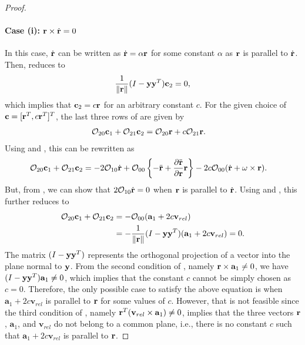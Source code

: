 \begin{proof}
\paragraph{Case (i): $\mathbf{r}\times\dot {\mathbf{r}}=0$} In this case, $\dot {\mathbf{r}}$ can be written as $\dot {\mathbf{r}} = \alpha\mathbf{r}$ for some constant $\alpha$ as $\mathbf{r}$ is parallel to $\dot{\mathbf{r}}$. Then,  reduces to 
\begin{align*}
\frac{1}{\|\mathbf{r}\|}(I-\mathbf{y}\mathbf{y}^T)\mathbf{c}_2=0,
\end{align*}
which implies that $\mathbf{c}_2= c\mathbf{r}$ for an arbitrary constant $c$. For the given choice of $\mathbf{c}=[\mathbf{r}^T,c\mathbf{r}^T]^T$, the last three rows of  are given by
\begin{align*}
\mathcal{O}_{20} \mathbf{c}_1 +\mathcal{O}_{21} \mathbf{c}_2 
& = \mathcal{O}_{20} \mathbf{r} + c\mathcal{O}_{21} \mathbf{r}.
\end{align*}
Using  and , this can be rewritten as
\begin{align*}
\mathcal{O}_{20} \mathbf{c}_1 +\mathcal{O}_{21} \mathbf{c}_2 
& =
-2\mathcal{O}_{10}\dot{\mathbf{r}} +\mathcal{O}_{00}\left\{ -\ddot {\mathbf{r}} +\frac{\partial \ddot{\mathbf{r}}}{\partial \mathbf{r}}\mathbf{r} \right\}
-2c\mathcal{O}_{00} (\dot{\mathbf{r}}+\omega\times\mathbf{r}).
\end{align*}
But, from , we can show that $2\mathcal{O}_{10}\dot{\mathbf{r}}=0$ when $\mathbf{r}$ is parallel to $\dot {\mathbf{r}}$. Using  and , this further reduces to
\begin{align}
\mathcal{O}_{20} \mathbf{c}_1 +\mathcal{O}_{21} \mathbf{c}_2 
& =
-\mathcal{O}_{00}(\mathbf{a}_1 +2c \mathbf{v}_{rel})\nonumber\\
& = - \frac{1}{\|\mathbf{r}\|}(I-\mathbf{y}\mathbf{y}^T)(\mathbf{a}_1 +2c \mathbf{v}_{rel})=0.\label{eqn:row3i}
\end{align}
The matrix $(I-\mathbf{y}\mathbf{y}^T)$ represents the orthogonal projection of a vector into the plane normal to $\mathbf{y}$. From the second condition of , namely $\mathbf{r}\times\mathbf{a}_1\neq 0$, we have $(I-\mathbf{y}\mathbf{y}^T)\mathbf{a}_1\neq 0$, which implies that the constant $c$ cannot be simply chosen as $c=0$. Therefore, the only possible case to satisfy the above equation is when $\mathbf{a}_1 +2c \mathbf{v}_{rel}$ is parallel to $\mathbf{r}$ for some values of $c$. However, that is not feasible since the third condition of , namely $\mathbf{r}^T(\mathbf{v}_{rel}\times\mathbf{a}_1)\neq0$,  implies that the three vectors $\mathbf{r}$, $\mathbf{a}_1$, and $\mathbf{v}_{rel}$ do not belong to a common plane, i.e., there is no constant $c$ such that $\mathbf{a}_1 +2c \mathbf{v}_{rel}$ is parallel to $\mathbf{r}$.


\end{proof}
